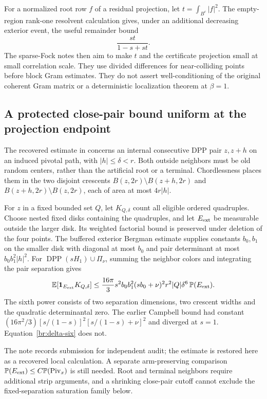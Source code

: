 \documentclass[11pt,a4paper]{article}
\theoremstyle{definition}
\theoremstyle{remark}
\numberwithin{equation}{section}
\begin{document}
For a normalized root row $f$ of a residual projection, let
$t=\int_{B^c}|f|^2$.  The empty-region rank-one resolvent calculation
gives, under an additional decreasing exterior event, the useful
remainder bound
\[
 \frac{st}{1-s+st}.
\]
The sparse-Fock notes then aim to make $t$ and the certificate
projection small at small correlation scale.  They use divided
differences for near-colliding points before block Gram estimates.
They do not assert well-conditioning of the original coherent Gram
matrix or a deterministic localization theorem at $\beta=1$.

\subsection{A protected close-pair bound uniform at the projection endpoint}
\label{br:close-pairs}

The recovered estimate in 
concerns an internal consecutive DPP pair $z,z+h$ on an induced
pivotal path, with $|h|\le\delta<r$. Both outside neighbors must be
old random centers, rather than the artificial root or a terminal.
Chordlessness places them in the two disjoint crescents
$B(z,2r)\setminus B(z+h,2r)$ and
$B(z+h,2r)\setminus B(z,2r)$, each of area at most $4r|h|$.

For $z$ in a fixed bounded set $Q$, let $K_{Q,\delta}$ count all
eligible ordered quadruples. Choose nested fixed disks containing
the quadruples, and let $E_{\rm ext}$ be measurable outside the
larger disk. Its weighted factorial bound is preserved under deletion
of the four points. The buffered exterior Bergman estimate supplies
constants $b_0,b_1$ on the smaller disk with diagonal at most $b_0$
and pair determinant at most $b_0b_1^2|h|^2$.
For $\operatorname{DPP}(sH_1)\cup\Pi_\nu$, summing the neighbor colors
and integrating the pair separation gives
\begin{equation}\label{br:delta-six}
 \mathbb E[\mathbf1_{E_{\rm ext}}K_{Q,\delta}]
 \le \frac{16\pi}{3}s^2b_0b_1^2(sb_0+\nu)^2
           r^2|Q|\delta^6\,\mathbb P(E_{\rm ext}).
\end{equation}
The sixth power consists of two separation dimensions, two crescent
widths and the quadratic determinantal zero. The earlier Campbell
bound had constant
$(16\pi^2/3)[s/(1-s)]^2[s/(1-s)+\nu]^2$ and diverged at $s=1$.
Equation~\eqref{br:delta-six} does not.

The note records submission for independent audit; the estimate is
restored here as a recovered local calculation. A separate
arm-preserving comparison
$\mathbb P(E_{\rm ext})\le C\mathbb P(\mathrm{Piv}_x)$ is still
needed. Root and terminal neighbors require additional strip
arguments, and a shrinking close-pair cutoff cannot exclude the
fixed-separation saturation family below.
\end{document}
